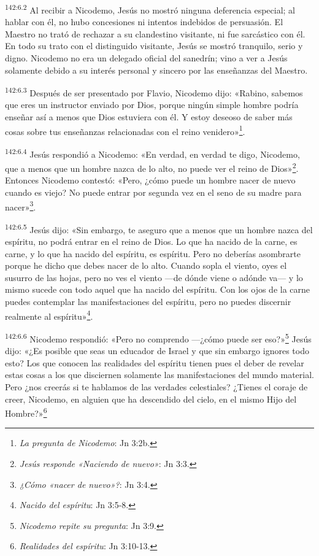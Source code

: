\par
\textsuperscript{142:6.2} Al recibir a Nicodemo, Jesús no mostró ninguna deferencia especial; al hablar con él, no hubo concesiones ni intentos indebidos de persuasión. El Maestro no trató de rechazar a su clandestino visitante, ni fue sarcástico con él. En todo su trato con el distinguido visitante, Jesús se mostró tranquilo, serio y digno. Nicodemo no era un delegado oficial del sanedrín; vino a ver a Jesús solamente debido a su interés personal y sincero por las enseñanzas del Maestro.

\par
\textsuperscript{142:6.3} Después de ser presentado por Flavio, Nicodemo dijo: «Rabino, sabemos que eres un instructor enviado por Dios, porque ningún simple hombre podría enseñar así a menos que Dios estuviera con él. Y estoy deseoso de saber más cosas sobre tus enseñanzas relacionadas con el reino venidero»\footnote{\textit{La pregunta de Nicodemo}: Jn 3:2b.}.

\par
\textsuperscript{142:6.4} Jesús respondió a Nicodemo: «En verdad, en verdad te digo, Nicodemo, que a menos que un hombre nazca de lo alto, no puede ver el reino de Dios»\footnote{\textit{Jesús responde «Naciendo de nuevo»}: Jn 3:3.}. Entonces Nicodemo contestó: «Pero, ¿cómo puede un hombre nacer de nuevo cuando es viejo? No puede entrar por segunda vez en el seno de su madre para nacer»\footnote{\textit{¿Cómo «nacer de nuevo»?}: Jn 3:4.}.

\par
\textsuperscript{142:6.5} Jesús dijo: «Sin embargo, te aseguro que a menos que un hombre nazca del espíritu, no podrá entrar en el reino de Dios. Lo que ha nacido de la carne, es carne, y lo que ha nacido del espíritu, es espíritu. Pero no deberías asombrarte porque he dicho que debes nacer de lo alto. Cuando sopla el viento, oyes el susurro de las hojas, pero no ves el viento ---de dónde viene o adónde va--- y lo mismo sucede con todo aquel que ha nacido del espíritu. Con los ojos de la carne puedes contemplar las manifestaciones del espíritu, pero no puedes discernir realmente al espíritu»\footnote{\textit{Nacido del espíritu}: Jn 3:5-8.}.

\par
\textsuperscript{142:6.6} Nicodemo respondió: «Pero no comprendo ---¿cómo puede ser eso?»\footnote{\textit{Nicodemo repite su pregunta}: Jn 3:9.} Jesús dijo: «¿Es posible que seas un educador de Israel y que sin embargo ignores todo esto? Los que conocen las realidades del espíritu tienen pues el deber de revelar estas cosas a los que disciernen solamente las manifestaciones del mundo material. Pero ¿nos creerás si te hablamos de las verdades celestiales? ¿Tienes el coraje de creer, Nicodemo, en alguien que ha descendido del cielo, en el mismo Hijo del Hombre?»\footnote{\textit{Realidades del espíritu}: Jn 3:10-13.}

